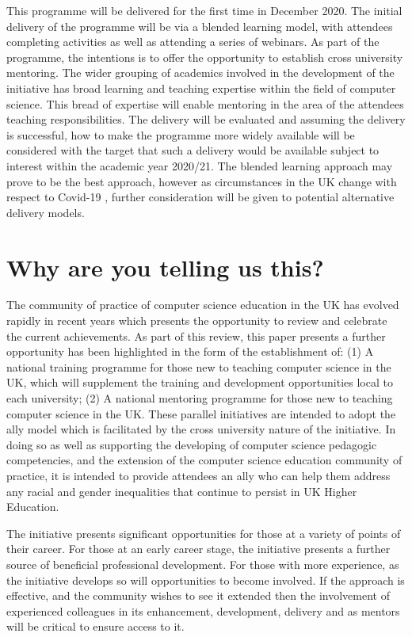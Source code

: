 \documentclass[sigconf]{acmart}
\begin{document}
This programme will be delivered for the first time in December 2020. The initial delivery of the programme will be via a blended learning model, with attendees completing activities as well as attending a series of webinars. As part of the programme, the intentions is to offer the opportunity to establish cross university mentoring. The wider grouping of academics involved in the development of the initiative has broad learning and teaching expertise within the field of computer science. This bread of expertise will enable mentoring in the area of the attendees teaching responsibilities. The delivery will be evaluated and assuming the delivery is successful, how to make the programme more widely available will be considered with the target that such a delivery would be available subject to interest within the academic year 2020/21. The blended learning approach may prove to be the best approach, however as circumstances in the UK change with respect to Covid-19 \cite{Crick20}, further consideration will be given to potential alternative delivery models.

\section{Why are you telling us this?}	
The community of practice of computer science education in the UK has evolved rapidly in recent years which presents the opportunity to  review and celebrate the current achievements. As part of this review, this paper presents a further opportunity has been highlighted in the form of the establishment of: (1) A national training programme for those new to teaching computer science in the UK, which will supplement the training and development opportunities local to each university; (2) A national mentoring programme for those new to teaching computer science in the UK. These parallel initiatives are intended to adopt the ally model which is facilitated by the cross university nature of the initiative. In doing so as well as supporting the developing of computer science pedagogic competencies, and  the extension of the computer science education community of practice, it is intended to provide attendees an ally who can help them address any racial and gender inequalities that continue to persist in UK Higher Education.

The initiative presents significant opportunities for those at a variety of points of their career. For those at an early career stage, the initiative presents a further source of beneficial professional development. For those with more experience, as the initiative develops so will opportunities to become involved. If the approach is effective, and the community wishes to see it extended then the involvement of experienced colleagues in its enhancement, development, delivery and as mentors will be critical to ensure access to it.
\end{document}
